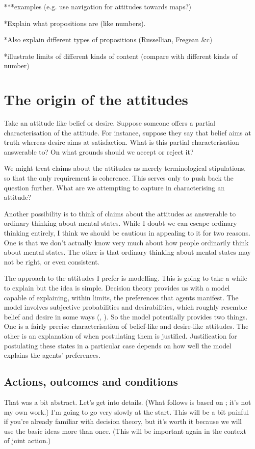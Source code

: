 \documentclass[12pt,\papersize]{extarticle}
\begin{document}
***examples (e.g. use navigation for attitudes towards maps?)

*Explain what propositions are (like numbers).  

*Also explain different types of propositions (Russellian, Fregean \&c)

*illustrate limits of different kinds of content (compare with different kinds of number)


\section{The origin of the attitudes}

Take an attitude like belief or desire.
Suppose someone offers a partial characterisation of the attitude.
For instance, 
suppose they say that belief aims at truth whereas desire aims at satisfaction.
What is this partial characterisation answerable to?
On what grounds should we accept or reject it?

We might treat claims about the attitudes as merely terminological stipulations, so that the only requirement is coherence.
This serves only to push back the question further.
What are we attempting to capture in characterising an attitude?  

Another possibility is to think of claims about the attitudes as answerable to ordinary thinking about mental states.
While I doubt we can escape ordinary thinking entirely, I think we should be cautious in appealing to it for two reasons.
One is that we don't actually know very much about how people ordinarily think about mental states.
The other is that ordinary thinking about mental states may not be right, or even consistent.

The approach to the attitudes I prefer is modelling.
This is going to take a while to explain but the idea is simple.
Decision theory provides us with a model capable of explaining, within limits, the preferences that agents manifest.
The model involves subjective probabilities and desirabilities, which roughly resemble belief and desire in some ways (\citealp[p.\ 59]{Jeffrey:1983oe}, \citealp{Davidson:1985qg}). 
So the model potentially provides two things.
One is a fairly precise characterisation of belief-like and desire-like attitudes.
The other is an explanation of when postulating them is justified.
Justification for postulating these states in a particular case depends on how well the model explains the agents' preferences.

\subsection{Actions, outcomes and conditions}
That was a bit abstract.
Let's get into details.
(What follows is based on \citealp{Jeffrey:1983oe}; it's not my own work.) 
I'm going to go very slowly at the start. 
This will be a bit painful if you're already familiar with decision theory, but it's worth it because we will use the basic ideas more than once.
(This will be important again in the context of joint action.)
\end{document}
